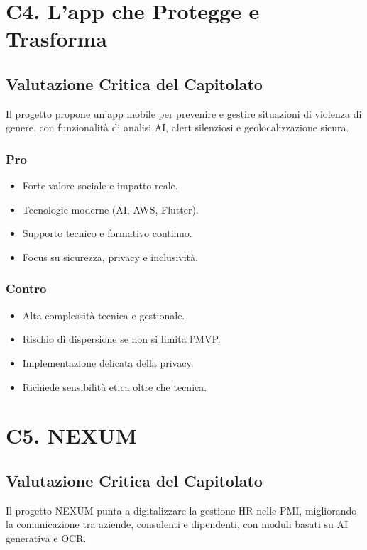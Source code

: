 \documentclass[a4paper, 11pt, oneside]{scrartcl} %
\begin{document}
\section{C4. L’app che Protegge e Trasforma}
\subsection*{Valutazione Critica del Capitolato}
Il progetto propone un’app mobile per prevenire e gestire situazioni di violenza di genere, con funzionalità di analisi AI, alert silenziosi e geolocalizzazione sicura.

\subsubsection*{Pro}
\begin{itemize}
    \item Forte valore sociale e impatto reale.
    \item Tecnologie moderne (AI, AWS, Flutter).
    \item Supporto tecnico e formativo continuo.
    \item Focus su sicurezza, privacy e inclusività.
\end{itemize}

\subsubsection*{Contro}
\begin{itemize}
    \item Alta complessità tecnica e gestionale.
    \item Rischio di dispersione se non si limita l’MVP.
    \item Implementazione delicata della privacy.
    \item Richiede sensibilità etica oltre che tecnica.
\end{itemize}

\section{C5. NEXUM}
\subsection*{Valutazione Critica del Capitolato}
Il progetto NEXUM punta a digitalizzare la gestione HR nelle PMI, migliorando la comunicazione tra aziende, consulenti e dipendenti, con moduli basati su AI generativa e OCR.
\end{document}
